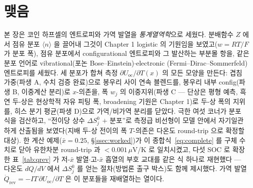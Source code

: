 \documentclass[11pt,a4paper]{article}
\newcommand{\rev}{\mathrm{rev}}
\newcommand{\oc}{\mathrm{oc}}
\newcommand{\avg}[1]{\langle #1\rangle}
\begin{document}
\section*{맺음}
본 장은 코인 하프셀의 엔트로피와 가역 발열을 \emph{통계열역학}으로 세웠다. 분배함수 $Z$ 에서 점유 분포
$\avg{n}$ 을 끌어내 그것이 Chapter 1 logistic 의 기원임을 보였고($w=RT/F$ 가 분포 폭), 점유 분포에서
configurational 엔트로피와 그 발산하는 부분몰 항을, 같은 분포 언어로 vibrational(포논 Bose--Einstein)$\cdot$electronic
(Fermi--Dirac--Sommerfeld) 엔트로피를 세웠다. 세 분포가 합쳐 측정 $\partial U_\oc/\partial T(x)$ 의 모든 모양을 만든다:
겹침 가중(파생 A, 수치 검증 완료)으로 봉우리 사이 연속 블렌드를, 봉우리 내부 config(파생 B, 이중계산 분리)로
$x$-의존을, 폭 $w_j$ 의 이중지위(파생 C — 단상은 평형 예측, 흑연 두-상은 현상학적 자유 피팅 폭, broadening
기원은 Chapter 1)로 두-상 폭의 지위를, 히스 분기 평균(파생 D)으로 가역/비가역
분리를 닫았다. 극한 여섯 코너가 분포 식을 검산하고, ``전이당 상수 $\Delta S^0_j$ $+$ 분포''로 측정급 비선형이
모델 안에서 자기일관하게 산출됨을 보였다(지배 두-상 전이의 폭 $T$-의존은 다온도 round-trip 으로 확정할 대상). 한 계산 예제($\bar x{=}0.25$, \S\ref{ssec:worked})가 이 종합식~\eqref{eq:complete} 를 구체 수치로 닫아 유한차분 round-trip 과 $<0.001\,\mu$V/K 로 일치시켰고, 다섯 SOC 로 확장한 표~\ref{tab:qrev} 가 저-$\bar x$ 발열$\cdot$고-$\bar x$ 흡열의 부호 교대를 같은 식 하나로 재현했다 --- 다온도 $dQ/dV$ 에서 $\Delta S^0_j$ 를 얻는 절차(방법론 출구 박스)도 함께 제시했다.
가역 발열 $\dot Q_\rev=-IT\,\partial U_\oc/\partial T$ 은 이 분포들을 재배열하는 열이다.
\end{document}
